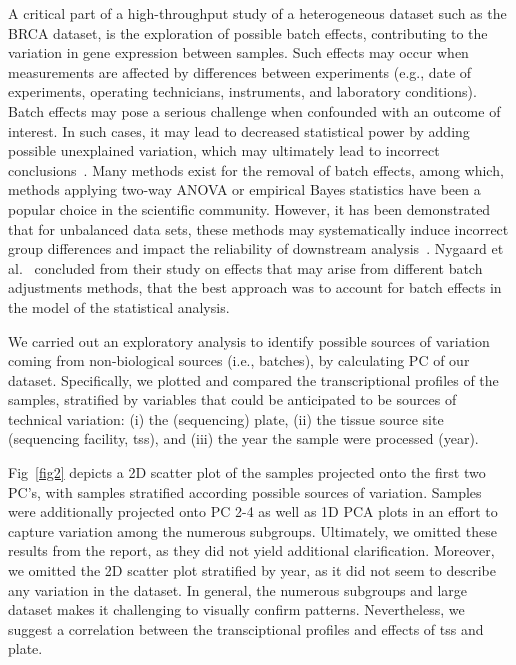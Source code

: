 \documentclass[10pt,letterpaper]{article}
\begin{document}
A critical part of a high-throughput study of a heterogeneous dataset such as the BRCA dataset, is the exploration of possible batch effects, contributing to the variation in gene expression between samples. Such effects may occur when measurements are affected by differences between experiments (e.g., date of experiments, operating technicians, instruments, and laboratory conditions). Batch effects may pose a serious challenge when confounded with an outcome of interest. In such cases, it may lead to decreased statistical power by adding possible unexplained variation, which may ultimately lead to incorrect conclusions~\cite{Leek2010, Liu2016}.
Many methods exist for the removal of batch effects, among which, methods applying two-way ANOVA or empirical Bayes statistics have been a popular choice in the scientific community. However, it has been demonstrated that for unbalanced data sets, these methods may systematically induce incorrect group differences and impact the reliability of downstream analysis~\cite{Nygaard2016, Liu2016}. Nygaard et al.~\cite{Nygaard2016} concluded from their study on effects that may arise from different batch adjustments methods, that the best approach was to account for batch effects in the model of the statistical analysis.

We carried out an exploratory analysis to identify possible sources of variation coming from non-biological sources (i.e., batches), by calculating PC of our dataset. Specifically, we plotted and compared the transcriptional profiles of the samples, stratified by variables that could be anticipated to be sources of technical variation: (i) the (sequencing) plate, (ii) the tissue source site (sequencing facility, tss), and (iii) the year the sample were processed (year). 

\smallskip

Fig~\ref{fig2} depicts a 2D scatter plot of the samples projected onto the first two PC's, with samples stratified according possible sources of variation. Samples were additionally projected onto PC 2-4 as well as 1D PCA plots in an effort to capture variation among the numerous subgroups. Ultimately, we omitted these results from the report, as they did not yield additional clarification. Moreover, we omitted the 2D scatter plot stratified by year, as it did not seem to describe any variation in the dataset.
In general, the numerous subgroups and large dataset makes it challenging to visually confirm patterns. Nevertheless, we suggest a correlation between the transciptional profiles and effects of tss and plate. 
\end{document}
